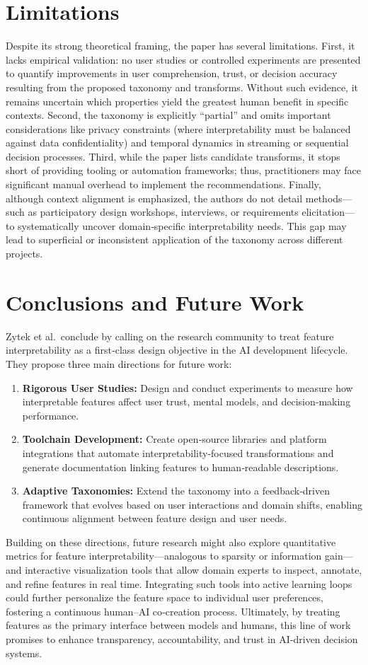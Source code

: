 \documentclass[12pt]{article}
\begin{document}
\section{Limitations}
Despite its strong theoretical framing, the paper has several limitations. First, it lacks empirical validation: no user studies or controlled experiments are presented to quantify improvements in user comprehension, trust, or decision accuracy resulting from the proposed taxonomy and transforms. Without such evidence, it remains uncertain which properties yield the greatest human benefit in specific contexts. Second, the taxonomy is explicitly “partial” and omits important considerations like privacy constraints (where interpretability must be balanced against data confidentiality) and temporal dynamics in streaming or sequential decision processes. Third, while the paper lists candidate transforms, it stops short of providing tooling or automation frameworks; thus, practitioners may face significant manual overhead to implement the recommendations. Finally, although context alignment is emphasized, the authors do not detail methods—such as participatory design workshops, interviews, or requirements elicitation—to systematically uncover domain‐specific interpretability needs. This gap may lead to superficial or inconsistent application of the taxonomy across different projects.

\section{Conclusions and Future Work}
Zytek et al.\ conclude by calling on the research community to treat feature interpretability as a first‐class design objective in the AI development lifecycle. They propose three main directions for future work:
\begin{enumerate}
    \item \textbf{Rigorous User Studies:} Design and conduct experiments to measure how interpretable features affect user trust, mental models, and decision‐making performance.
    \item \textbf{Toolchain Development:} Create open‐source libraries and platform integrations that automate interpretability‐focused transformations and generate documentation linking features to human‐readable descriptions.
    \item \textbf{Adaptive Taxonomies:} Extend the taxonomy into a feedback‐driven framework that evolves based on user interactions and domain shifts, enabling continuous alignment between feature design and user needs.
\end{enumerate}
Building on these directions, future research might also explore quantitative metrics for feature interpretability—analogous to sparsity or information gain—and interactive visualization tools that allow domain experts to inspect, annotate, and refine features in real time. Integrating such tools into active learning loops could further personalize the feature space to individual user preferences, fostering a continuous human–AI co‐creation process. Ultimately, by treating features as the primary interface between models and humans, this line of work promises to enhance transparency, accountability, and trust in AI‐driven decision systems.
\end{document}
